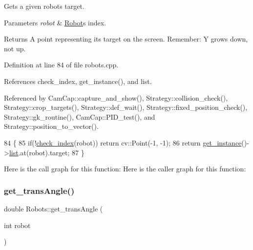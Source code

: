 Gets a given robot\textquotesingle{}s target. 
\begin{DoxyParams}{Parameters}
{\em robot} & \hyperlink{struct_robots_1_1_robot}{Robot}\textquotesingle{}s index. \\
\hline
\end{DoxyParams}
\begin{DoxyReturn}{Returns}
A point representing its target on the screen. Remember\+: Y grows down, not up. 
\end{DoxyReturn}


Definition at line 84 of file robots.\+cpp.



References check\+\_\+index, get\+\_\+instance(), and list.



Referenced by Cam\+Cap\+::capture\+\_\+and\+\_\+show(), Strategy\+::collision\+\_\+check(), Strategy\+::crop\+\_\+targets(), Strategy\+::def\+\_\+wait(), Strategy\+::fixed\+\_\+position\+\_\+check(), Strategy\+::gk\+\_\+routine(), Cam\+Cap\+::\+P\+I\+D\+\_\+test(), and Strategy\+::position\+\_\+to\+\_\+vector().


\begin{DoxyCode}
84                                     \{
85     \textcolor{keywordflow}{if}(!\hyperlink{robots_8hpp_ae3e6ae8f87cdc750c0b99bc609d9ae43}{check\_index}(robot)) \textcolor{keywordflow}{return} cv::Point(-1, -1);
86     \textcolor{keywordflow}{return} \hyperlink{class_robots_a589bce74db5f34af384952d48435168f}{get\_instance}()->\hyperlink{class_robots_a2c6b77265028f82a4342ca1ef15ed305}{list}.at(robot).target;
87 \}
\end{DoxyCode}
Here is the call graph for this function\+:
Here is the caller graph for this function\+:
\mbox{\label{class_robots_af3cabeacfb88dd920f581939935e76ca}} 
\subsubsection{\texorpdfstring{get\+\_\+trans\+Angle()}{get\_transAngle()}}
{\footnotesize\ttfamily double Robots\+::get\+\_\+trans\+Angle (\begin{DoxyParamCaption}\item[{int}]{robot }\end{DoxyParamCaption})\hspace{0.3cm}{\ttfamily [static]}}


